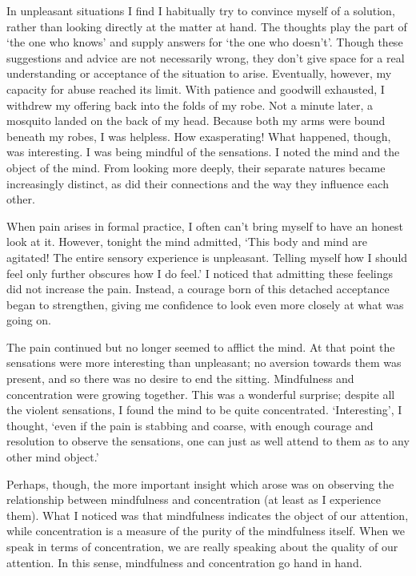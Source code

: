 In unpleasant situations I find I habitually try to convince myself of a
solution, rather than looking directly at the matter at hand. The
thoughts play the part of `the one who knows' and supply answers for
`the one who doesn't'. Though these suggestions and advice are not
necessarily wrong, they don't give space for a real understanding or
acceptance of the situation to arise. Eventually, however, my capacity
for abuse reached its limit. With patience and goodwill exhausted, I
withdrew my offering back into the folds of my robe. Not a minute later, 
a mosquito landed on the back of my head. Because both my arms were
bound beneath my robes, I was helpless. How exasperating! What happened, 
though, was interesting. I was being mindful of the sensations. I noted
the mind and the object of the mind. From looking more deeply, their
separate natures became increasingly distinct, as did their connections
and the way they influence each other. 

When pain arises in formal practice, I often can't bring myself to have
an honest look at it. However, tonight the mind admitted, `This body and
mind are agitated! The entire sensory experience is unpleasant. Telling
myself how I should feel only further obscures how I do feel.' I noticed
that admitting these feelings did not increase the pain. Instead, a
courage born of this detached acceptance began to strengthen, giving me
confidence to look even more closely at what
was going on.

The pain continued but no longer seemed to afflict the
mind. At that point the sensations were more interesting than
unpleasant; no aversion towards them was present, and so there was no
desire to end the sitting. Mindfulness and concentration were growing
together. This was a wonderful surprise; despite all the violent
sensations, I found the mind to be quite concentrated. `Interesting', I
thought, `even if the pain is stabbing and coarse, with enough courage
and resolution to observe the sensations, one can just as well attend to
them as to any other mind object.'

Perhaps, though, the more important insight which arose was on observing
the relationship between mindfulness and concentration (at least as I
experience them). What I noticed was that mindfulness indicates the
object of our attention, while concentration is a measure of the purity
of the mindfulness itself. When we speak in terms of concentration, we
are really speaking about the quality of our attention. In this sense, 
mindfulness and concentration go hand in hand. 

